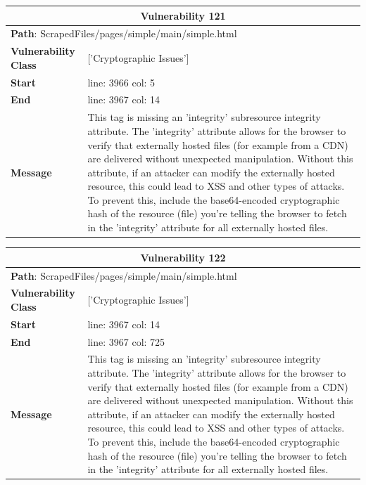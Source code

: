 \documentclass[12pt]{article}
\begin{document}
\vspace{0.7cm}
\FloatBarrier
\begin{table}[!h]
\centering
\renewcommand{\arraystretch}{1.3}
\begin{tabular}{|l|p{10cm}|}
\hline
\multicolumn{2}{|c|}{\textbf{Vulnerability 121}} \\
\hline
\multicolumn{2}{|l|}{\textbf{Path}: ScrapedFiles/pages/simple/main/simple.html} \\
\hline
\textbf{Vulnerability Class} & ['Cryptographic Issues'] \\
\hline
\textbf{Start} & line: 3966 \quad col: 5 \\
\hline
\textbf{End} & line: 3967 \quad col: 14 \\
\hline
\textbf{Message} & This tag is missing an 'integrity' subresource integrity attribute. The 'integrity' attribute allows for the browser to verify that externally hosted files (for example from a CDN) are delivered without unexpected manipulation. Without this attribute, if an attacker can modify the externally hosted resource, this could lead to XSS and other types of attacks. To prevent this, include the base64-encoded cryptographic hash of the resource (file) you're telling the browser to fetch in the 'integrity' attribute for all externally hosted files. \\
\hline
\end{tabular}
\end{table}
\vspace{0.7cm}
\FloatBarrier
\begin{table}[!h]
\centering
\renewcommand{\arraystretch}{1.3}
\begin{tabular}{|l|p{10cm}|}
\hline
\multicolumn{2}{|c|}{\textbf{Vulnerability 122}} \\
\hline
\multicolumn{2}{|l|}{\textbf{Path}: ScrapedFiles/pages/simple/main/simple.html} \\
\hline
\textbf{Vulnerability Class} & ['Cryptographic Issues'] \\
\hline
\textbf{Start} & line: 3967 \quad col: 14 \\
\hline
\textbf{End} & line: 3967 \quad col: 725 \\
\hline
\textbf{Message} & This tag is missing an 'integrity' subresource integrity attribute. The 'integrity' attribute allows for the browser to verify that externally hosted files (for example from a CDN) are delivered without unexpected manipulation. Without this attribute, if an attacker can modify the externally hosted resource, this could lead to XSS and other types of attacks. To prevent this, include the base64-encoded cryptographic hash of the resource (file) you're telling the browser to fetch in the 'integrity' attribute for all externally hosted files. \\
\hline
\end{tabular}
\end{table}
\end{document}
